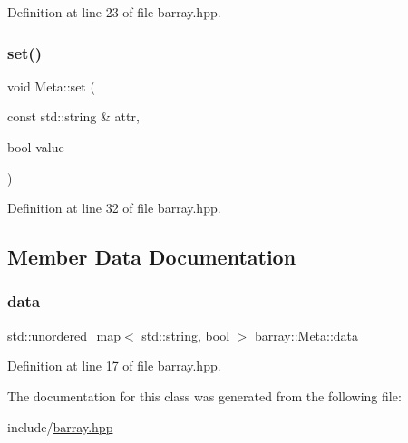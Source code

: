 Definition at line 23 of file barray.\+hpp.

\mbox{\label{classbarray_1_1_meta_a988be331a6084a39edafbeb7c5553ca5}} 
\subsubsection{\texorpdfstring{set()}{set()}}
{\footnotesize\ttfamily void Meta\+::set (\begin{DoxyParamCaption}\item[{const std\+::string \&}]{attr,  }\item[{bool}]{value }\end{DoxyParamCaption})\hspace{0.3cm}{\ttfamily [inline]}}



Definition at line 32 of file barray.\+hpp.



\subsection{Member Data Documentation}
\mbox{\label{classbarray_1_1_meta_ab5bb9f81ec51907231fc5b89717e34e3}} 
\subsubsection{\texorpdfstring{data}{data}}
{\footnotesize\ttfamily std\+::unordered\+\_\+map$<$ std\+::string, bool $>$ barray\+::\+Meta\+::data}



Definition at line 17 of file barray.\+hpp.



The documentation for this class was generated from the following file\+:\begin{DoxyCompactItemize}
\item 
include/\hyperlink{barray_8hpp}{barray.\+hpp}\end{DoxyCompactItemize}
